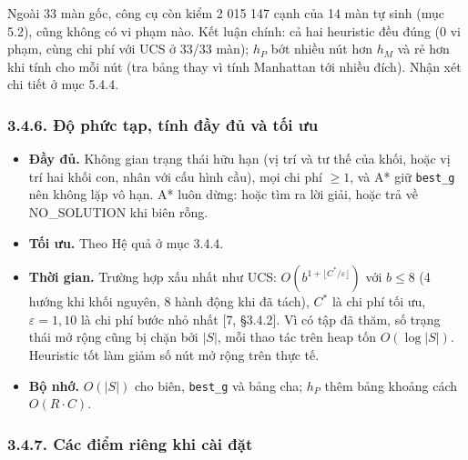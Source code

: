 Ngoài 33 màn gốc, công cụ còn kiểm 2 015 147 cạnh của 14 màn tự sinh (mục 5.2), cũng không có vi phạm nào. Kết luận chính: cả hai heuristic đều đúng (0 vi phạm, cùng chi phí với UCS ở 33/33 màn); \(h_P\) bớt nhiều nút hơn \(h_M\) và rẻ hơn khi tính cho mỗi nút (tra bảng thay vì tính Manhattan tới nhiều đích). Nhận xét chi tiết ở mục 5.4.4.

\subsubsection{3.4.6. Độ phức tạp, tính đầy đủ và tối ưu}

\begin{itemize}
\tightlist
\item
  \textbf{Đầy đủ.} Không gian trạng thái hữu hạn (vị trí và tư thế của khối, hoặc vị trí hai khối con, nhân với cấu hình cầu), mọi chi phí \(\ge 1\), và A* giữ \texttt{best\_\allowbreak{}g} nên không lặp vô hạn. A* luôn dừng: hoặc tìm ra lời giải, hoặc trả về NO\_SOLUTION khi biên rỗng.
\item
  \textbf{Tối ưu.} Theo Hệ quả ở mục 3.4.4.
\item
  \textbf{Thời gian.} Trường hợp xấu nhất như UCS: \(O(b^{1 + \lfloor C^*/\varepsilon \rfloor})\) với \(b \le 8\) (4 hướng khi khối nguyên, 8 hành động khi đã tách), \(C^*\) là chi phí tối ưu, \(\varepsilon = 1{,}10\) là chi phí bước nhỏ nhất {[}7, §3.4.2{]}. Vì có tập đã thăm, số trạng thái mở rộng cũng bị chặn bởi \(|S|\), mỗi thao tác trên heap tốn \(O(\log |S|)\). Heuristic tốt làm giảm số nút mở rộng trên thực tế.
\item
  \textbf{Bộ nhớ.} \(O(|S|)\) cho biên, \texttt{best\_\allowbreak{}g} và bảng cha; \(h_P\) thêm bảng khoảng cách \(O(R \cdot C)\).
\end{itemize}

\subsubsection{3.4.7. Các điểm riêng khi cài đặt}

